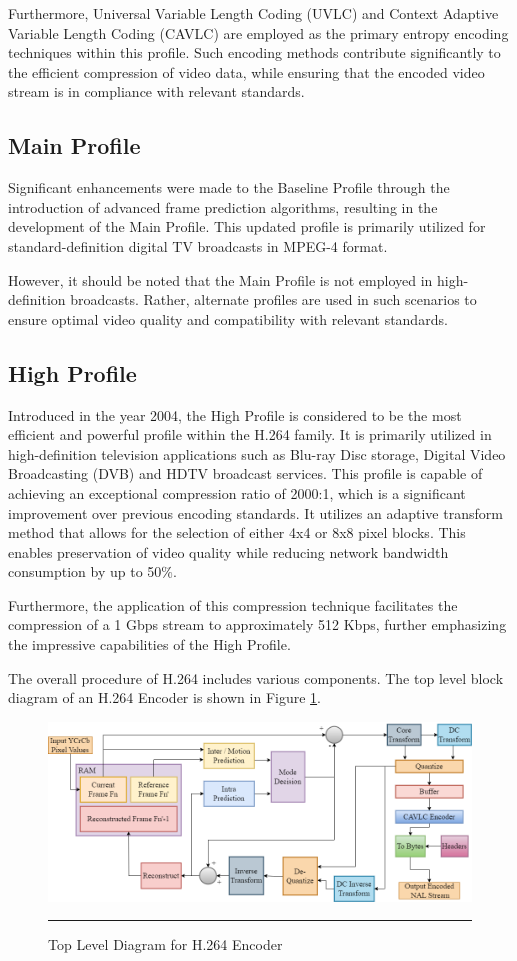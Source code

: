 Furthermore, Universal Variable Length Coding (UVLC) and Context Adaptive Variable Length Coding (CAVLC) are employed as the primary entropy encoding techniques within this profile. Such encoding methods contribute significantly to the efficient compression of video data, while ensuring that the encoded video stream is in compliance with relevant standards. 

\subsection{Main Profile}
Significant enhancements were made to the Baseline Profile through the introduction of advanced frame prediction algorithms, resulting in the development of the Main Profile. This updated profile is primarily utilized for standard-definition digital TV broadcasts in MPEG-4 format.

However, it should be noted that the Main Profile is not employed in high-definition broadcasts. Rather, alternate profiles are used in such scenarios to ensure optimal video quality and compatibility with relevant standards.

\subsection{High Profile}
Introduced in the year 2004, the High Profile is considered to be the most efficient and powerful profile within the H.264 family. It is primarily utilized in high-definition television applications such as Blu-ray Disc storage, Digital Video Broadcasting (DVB) and HDTV broadcast services. This profile is capable of achieving an exceptional compression ratio of 2000:1, which is a significant improvement over previous encoding standards. It utilizes an adaptive transform method that allows for the selection of either 4x4 or 8x8 pixel blocks. This enables preservation of video quality while reducing network bandwidth consumption by up to 50$\%$.

Furthermore, the application of this compression technique facilitates the compression of a 1 Gbps stream to approximately 512 Kbps, further emphasizing the impressive capabilities of the High Profile.

The overall procedure of H.264 includes various components. The top level block diagram of an H.264 Encoder is shown in Figure \ref{fig:toplevel}.

\begin{figure}[H]
	\centering
	\includegraphics[width = 5in]{./Figures/toplevel.png}
	\rule{35em}{0.5pt}
	\caption{Top Level Diagram for H.264 Encoder}
	\label{fig:toplevel}
\end{figure}

